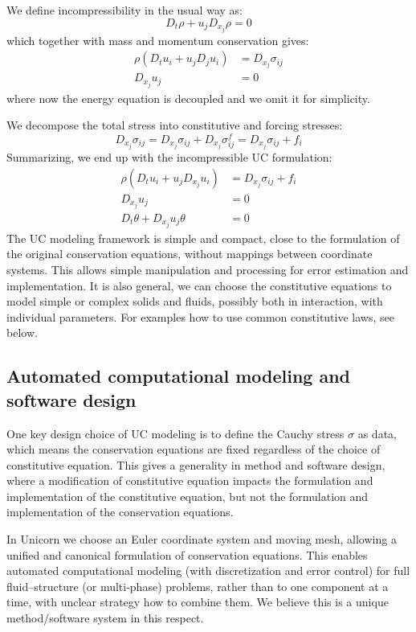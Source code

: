 We define incompressibility in the usual way as:
\begin{equation}
D_t \rho + u_j D_{x_j} \rho = 0
\end{equation}
which together with mass and momentum conservation gives:
\begin{align}
\rho(D_t u_i + u_j D_j u_i) &= D_{x_j} \sigma_{ij}
\\
D_{x_j} u_j &= 0
\end{align}
where now the energy equation is decoupled and we omit it for simplicity.

We decompose the total stress into constitutive and forcing stresses:
\begin{equation}
D_{x_j} \sigma_{ij} = D_{x_j} \sigma_{ij} + D_{x_j} \sigma^f_{ij}
                    = D_{x_j} \sigma_{ij} + f_i
\end{equation}
Summarizing, we end up with the incompressible UC formulation:
\begin{align}
  \rho(D_t u_i + u_j D_{x_j} u_i) &= D_{x_j} \sigma_{ij} + f_i
\\
  D_{x_j} u_j &= 0
\\
  D_t \theta + D_{x_j} u_j \theta &= 0
\end{align}
The UC modeling framework is simple and compact, close to the formulation
of the original conservation equations, without mappings between
coordinate systems. This allows simple manipulation and processing for
error estimation and implementation. It is also general, we can choose
the constitutive equations to model simple or complex solids and fluids,
possibly both in interaction, with individual parameters. For examples
how to use common constitutive laws, see below.

\subsection{Automated computational modeling and software design}

One key design choice of UC modeling is to define the Cauchy stress
$\sigma$ as data, which means the conservation equations are fixed
regardless of the choice of constitutive equation. This gives a generality
in method and software design, where a modification of constitutive
equation impacts the formulation and implementation of the constitutive
equation, but not the formulation and implementation of the conservation
equations.

In Unicorn we choose an Euler coordinate system and moving mesh, allowing
a unified and canonical formulation of conservation equations. This
enables automated computational modeling (with discretization and error
control) for full fluid--structure (or multi-phase) problems, rather
than to one component at a time, with unclear strategy how to combine
them. We believe this is a unique method/software system in this respect.

